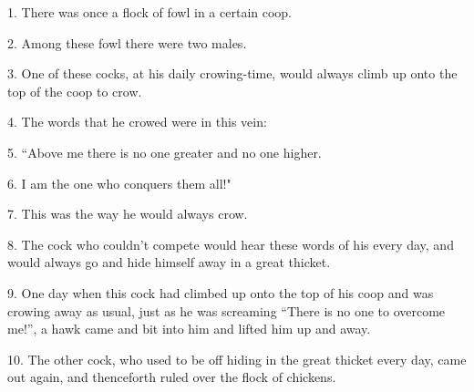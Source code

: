 \setcounter{footnote}{0}

1. There was once a flock of fowl in a certain coop.

2. Among these fowl there were two males.

3. One of these cocks, at his daily crowing-time, would always climb up onto the
top of the coop to crow.

4. The words that he crowed were in this vein:

5. ``Above me there is no one greater and no one higher.

6. I am the one who conquers them all!"

7. This was the way he would always crow.

8. The cock who couldn't compete would hear these words of his every day, and would
always go and hide himself away in a great thicket.

9. One day when this cock had climbed up onto the top of his coop and was crowing
away as usual, just as he was screaming ``There is no one to overcome me!'', a
hawk came and bit into him and lifted him up and away.

10. The other cock, who used to be off hiding in the great thicket every day, came
out again, and thenceforth ruled over the flock of chickens.

